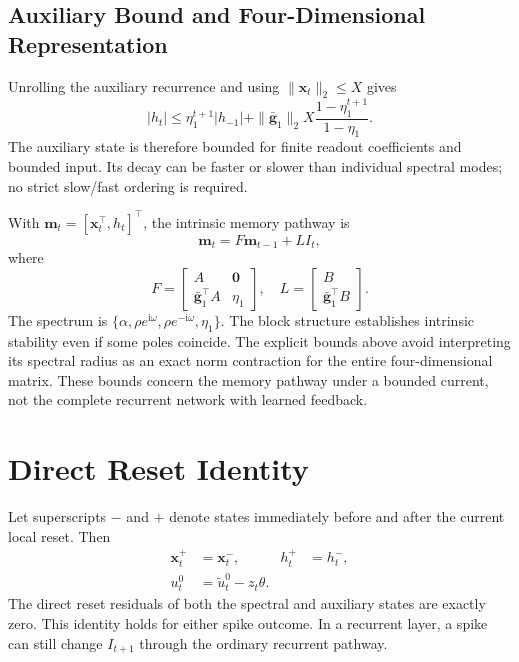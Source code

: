 \documentclass[letterpaper]{article}
\begin{document}
\subsection{Auxiliary Bound and Four-Dimensional Representation}

Unrolling the auxiliary recurrence and using $\|\mathbf x_t\|_2\le X$ gives
\begin{equation}
|h_t|\le\eta_1^{t+1}|h_{-1}|+\|\bar{\mathbf g}_1\|_2X\frac{1-\eta_1^{t+1}}{1-\eta_1}.
\label{eq:supp_auxiliary_bound}
\end{equation}
The auxiliary state is therefore bounded for finite readout coefficients and bounded input. Its decay can be faster or slower than individual spectral modes; no strict slow/fast ordering is required.

With $\mathbf m_t=[\mathbf x_t^\top,h_t]^\top$, the intrinsic memory pathway is
\begin{equation}
\mathbf m_t=F\mathbf m_{t-1}+LI_t,
\label{eq:supp_memory_system}
\end{equation}
where
\begin{equation}
F=\begin{bmatrix}A&\mathbf0\\\bar{\mathbf g}_1^\top A&\eta_1\end{bmatrix},\quad
L=\begin{bmatrix}B\\\bar{\mathbf g}_1^\top B\end{bmatrix}.
\label{eq:supp_memory_matrix}
\end{equation}
The spectrum is $\{\alpha,\rho e^{\mathrm i\omega},\rho e^{-\mathrm i\omega},\eta_1\}$. The block structure establishes intrinsic stability even if some poles coincide. The explicit bounds above avoid interpreting its spectral radius as an exact norm contraction for the entire four-dimensional matrix. These bounds concern the memory pathway under a bounded current, not the complete recurrent network with learned feedback.

\section{Direct Reset Identity}

Let superscripts $-$ and $+$ denote states immediately before and after the current local reset. Then
\begin{equation}
\begin{aligned}
\mathbf x_t^+&=\mathbf x_t^-,& h_t^+&=h_t^-,\\
u_t^0&=\widetilde u_t^0-z_t\theta.
\end{aligned}
\label{eq:supp_direct_reset_invariance}
\end{equation}
The direct reset residuals of both the spectral and auxiliary states are exactly zero. This identity holds for either spike outcome. In a recurrent layer, a spike can still change $I_{t+1}$ through the ordinary recurrent pathway.
\end{document}
